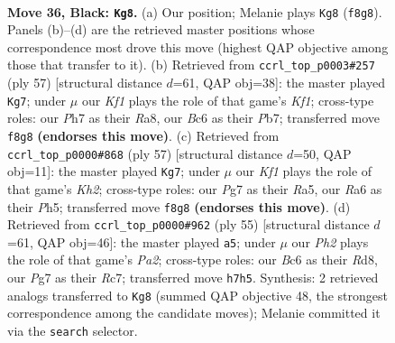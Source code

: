 \documentclass[11pt]{article}
\begin{document}
\clearpage

\begin{figure}[p]\centering
\begin{subfigure}{0.46\textwidth}\centering
\resizebox{\linewidth}{!}{%
\newchessgame
\chessboard[
  setfen={5k2/2r2ppp/rnbN4/p3p1P1/8/1P2P1R1/P5PP/RN3K2 b - - 1 36},
  showmover=false,
  pgfstyle=straightmove, color=movearrow, markmove={f8-g8}
]}
\caption{}
\end{subfigure}\hfill
\begin{subfigure}{0.46\textwidth}\centering
\resizebox{\linewidth}{!}{%
\newchessgame
\chessboard[
  setfen={r4k2/pp2pp2/6p1/2nPNbP1/3R4/4R3/P3PPBK/2r5 b - - 2 29},
  showmover=false,
  pgfstyle=straightmove, color=movearrow, markmove={f8-g7}
]}
\caption{}
\end{subfigure}
\\[4pt]
\begin{subfigure}{0.46\textwidth}\centering
\resizebox{\linewidth}{!}{%
\newchessgame
\chessboard[
  setfen={1b2r3/1p3p1k/5p2/r2p3p/p7/P1P2N2/1P3RPP/1K3R2 b - - 3 29},
  showmover=false,
  pgfstyle=straightmove, color=movearrow, markmove={h7-g7}
]}
\caption{}
\end{subfigure}\hfill
\begin{subfigure}{0.46\textwidth}\centering
\resizebox{\linewidth}{!}{%
\newchessgame
\chessboard[
  setfen={3r4/p1r2pkp/2b5/2n1p3/1R2P3/2P1R1P1/P2NB2P/4K3 b - - 14 28},
  showmover=false,
  pgfstyle=straightmove, color=movearrow, markmove={a7-a5}
]}
\caption{}
\end{subfigure}
\caption{\textbf{Move 36, Black: \texttt{Kg8}.} (a) Our position; Melanie plays \texttt{Kg8} (\texttt{f8g8}). Panels (b)--(d) are the retrieved master positions whose correspondence most drove this move (highest QAP objective among those that transfer to it). (b) Retrieved from \texttt{ccrl\_top\_p0003\#257} (ply 57) [structural distance $d$=61, QAP obj=38]: the master played \texttt{Kg7}; under $\mu$ our \emph{Kf1} plays the role of that game's \emph{Kf1}; cross-type roles: our \emph{P}h7 as their \emph{R}a8, our \emph{B}c6 as their \emph{P}b7; transferred move \texttt{f8g8} \textbf{(endorses this move)}. (c) Retrieved from \texttt{ccrl\_top\_p0000\#868} (ply 57) [structural distance $d$=50, QAP obj=11]: the master played \texttt{Kg7}; under $\mu$ our \emph{Kf1} plays the role of that game's \emph{Kh2}; cross-type roles: our \emph{P}g7 as their \emph{R}a5, our \emph{R}a6 as their \emph{P}h5; transferred move \texttt{f8g8} \textbf{(endorses this move)}. (d) Retrieved from \texttt{ccrl\_top\_p0000\#962} (ply 55) [structural distance $d$=61, QAP obj=46]: the master played \texttt{a5}; under $\mu$ our \emph{Ph2} plays the role of that game's \emph{Pa2}; cross-type roles: our \emph{B}c6 as their \emph{R}d8, our \emph{P}g7 as their \emph{R}c7; transferred move \texttt{h7h5}. Synthesis: 2 retrieved analogs transferred to \texttt{Kg8} (summed QAP objective 48, the strongest correspondence among the candidate moves); Melanie committed it via the \texttt{search} selector.}
\label{fig:thought-m71}
\end{figure}
\end{document}
